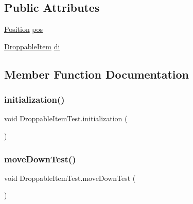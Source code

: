 \subsection*{Public Attributes}
\begin{DoxyCompactItemize}
\item 
\mbox{\hyperlink{class_position}{Position}} \mbox{\hyperlink{class_droppable_item_test_adad841a7c8ecced949d2b2d925163e5a}{pos}}
\item 
\mbox{\hyperlink{class_droppable_item}{Droppable\+Item}} \mbox{\hyperlink{class_droppable_item_test_a27f44f35ae846f3fec4c0c526d465340}{di}}
\end{DoxyCompactItemize}


\subsection{Member Function Documentation}
\mbox{\label{class_droppable_item_test_a21fe6227c90bc306be2cc17a857d6120}} 
\subsubsection{\texorpdfstring{initialization()}{initialization()}}
{\footnotesize\ttfamily void Droppable\+Item\+Test.\+initialization (\begin{DoxyParamCaption}{ }\end{DoxyParamCaption})\hspace{0.3cm}{\ttfamily [inline]}}

\mbox{\label{class_droppable_item_test_a6cf1fa022a5a09f02c6674dc66db4efb}} 
\subsubsection{\texorpdfstring{move\+Down\+Test()}{moveDownTest()}}
{\footnotesize\ttfamily void Droppable\+Item\+Test.\+move\+Down\+Test (\begin{DoxyParamCaption}{ }\end{DoxyParamCaption})\hspace{0.3cm}{\ttfamily [inline]}}

